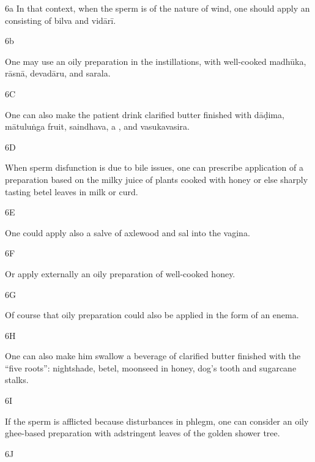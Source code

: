 \begin{translation}
\begin{sloka}
 \end{sloka}
 
 \item[6a] In that context, when the sperm is of the nature of wind, one
should apply an 
consisting of \gls{bilva} and \gls{vidārī}.
 
 \item[6b]
 
  One may use an oily preparation in the instillations, with well-cooked 
  \gls{madhūka},
  \gls{rāsnā},
  \gls{devadāru},
  and \gls{sarala}.
 
 
 \item[6C]
 
  One can also make the patient drink clarified butter finished with \gls{dāḍima}, 
  \gls{mātuluṅga} fruit, \gls{saindhava}, a , and 
  \gls{vasukavasira}.
 
 
 \item[6D]
 
   When sperm disfunction is due to bile issues, one can prescribe application of 
   a preparation based on the milky juice of plants cooked with honey or else 
   sharply tasting betel leaves in milk or curd.
 
 \item[6E]
 
  One could apply also a salve of axlewood and sal into the vagina.
 
 \item[6F]
 
  Or apply externally an oily preparation of well-cooked honey.
 
 \item[6G]
 
  Of course that oily preparation could also be applied in the form of an enema.
 
 \item[6H]
 
  One can also make him swallow a beverage of clarified butter finished with the 
  “five roots”: nightshade, betel, moonseed in honey, dog’s tooth and sugarcane 
  stalks. 
 
 \item[6I]
 
  If the sperm is afflicted because disturbances in phlegm, one can consider an 
  oily ghee-based preparation with adstringent leaves of the golden shower tree.
 
 \item[6J]
 

\end{translation}
